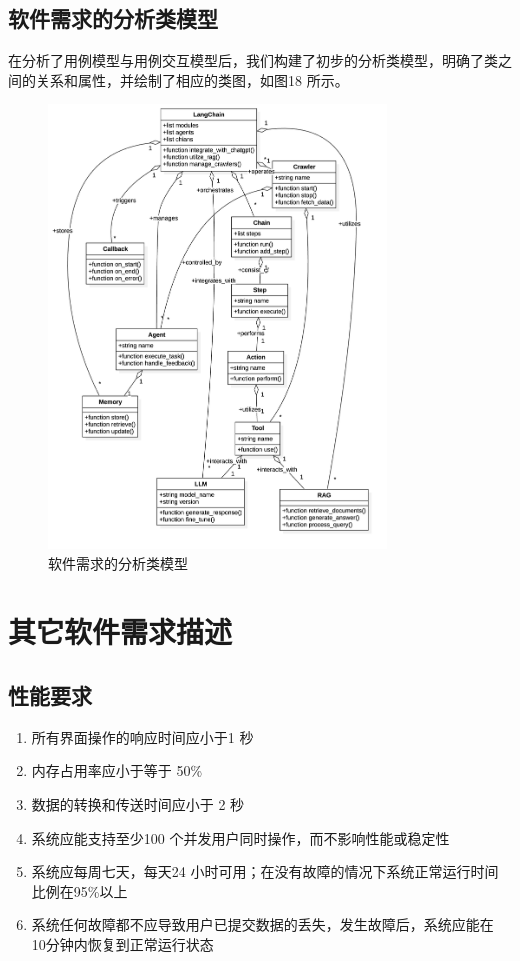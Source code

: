 \documentclass[
    report,     %
    oneside,    %
    UTF8,       %
    zihao=-4    %
]{config} %
\begin{document}
\subsection{软件需求的分析类模型}

在分析了用例模型与用例交互模型后，我们构建了初步的分析类模型，明确了类之间的关系和属性，并绘制了相应的类图，如图18 所示。
\begin{figure}[H]
    \centering
    \includegraphics[width=0.8\textwidth]{UML/ClassDiagram.png}
    \caption{软件需求的分析类模型}
    \label{fig:analysis-class-model}
\end{figure}

\section{其它软件需求描述}
\subsection{性能要求}
\begin{enumerate}[label=(\arabic*)]
    \item 所有界面操作的响应时间应小于1 秒
    \item 内存占用率应小于等于 50\%
    \item 数据的转换和传送时间应小于 2 秒
    \item 系统应能支持至少100 个并发用户同时操作，而不影响性能或稳定性
    \item 系统应每周七天，每天24 小时可用；在没有故障的情况下系统正常运行时间比例在95\%以上
    \item 系统任何故障都不应导致用户已提交数据的丢失，发生故障后，系统应能在 10分钟内恢复到正常运行状态
\end{enumerate}
\end{document}

